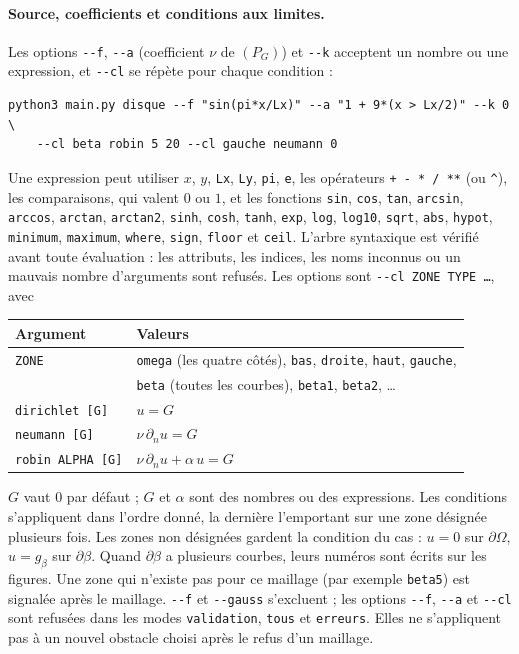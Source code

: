\documentclass[11pt,a4paper]{article}
\begin{document}
\paragraph{Source, coefficients et conditions aux limites.} Les options
\texttt{-{}-f}, \texttt{-{}-a} (coefficient $\nu$ de $(P_G)$) et \texttt{-{}-k}
acceptent un nombre ou une expression, et \texttt{-{}-cl} se répète pour chaque
condition :
\begin{verbatim}
python3 main.py disque --f "sin(pi*x/Lx)" --a "1 + 9*(x > Lx/2)" --k 0 \
    --cl beta robin 5 20 --cl gauche neumann 0
\end{verbatim}
Une expression peut utiliser $x$, $y$, \texttt{Lx}, \texttt{Ly}, \texttt{pi},
\texttt{e}, les opérateurs \texttt{+ - * / **} (ou \verb|^|), les comparaisons,
qui valent $0$ ou $1$, et les fonctions \texttt{sin}, \texttt{cos},
\texttt{tan}, \texttt{arcsin}, \texttt{arccos}, \texttt{arctan},
\texttt{arctan2}, \texttt{sinh}, \texttt{cosh}, \texttt{tanh}, \texttt{exp},
\texttt{log}, \texttt{log10}, \texttt{sqrt}, \texttt{abs}, \texttt{hypot},
\texttt{minimum}, \texttt{maximum}, \texttt{where}, \texttt{sign},
\texttt{floor} et \texttt{ceil}. L'arbre syntaxique est vérifié avant toute
évaluation : les attributs, les indices, les noms inconnus ou un mauvais nombre
d'arguments sont refusés. Les options sont \texttt{-{}-cl ZONE TYPE \dots}, avec
\begin{center}
\begin{tabular}{ll}
\hline
Argument & Valeurs \\
\hline
\texttt{ZONE} & \texttt{omega} (les quatre côtés), \texttt{bas}, \texttt{droite},
                \texttt{haut}, \texttt{gauche}, \\
              & \texttt{beta} (toutes les courbes), \texttt{beta1},
                \texttt{beta2}, \dots \\
\texttt{dirichlet [G]} & $u = G$ \\
\texttt{neumann [G]}   & $\nu\, \partial_n u = G$ \\
\texttt{robin ALPHA [G]} & $\nu\, \partial_n u + \alpha\, u = G$ \\
\hline
\end{tabular}
\end{center}
$G$ vaut $0$ par défaut ; $G$ et $\alpha$ sont des nombres ou des expressions.
Les conditions s'appliquent dans l'ordre donné, la dernière l'emportant sur
une zone désignée plusieurs fois. Les zones non désignées gardent la condition
du cas : $u = 0$ sur $\partial\Omega$, $u = g_\beta$ sur $\partial\beta$. Quand
$\partial\beta$ a plusieurs courbes, leurs numéros sont écrits sur les figures.
Une zone qui n'existe pas pour ce maillage (par exemple \texttt{beta5}) est
signalée après le maillage. \texttt{-{}-f} et \texttt{-{}-gauss} s'excluent ; les
options \texttt{-{}-f}, \texttt{-{}-a} et \texttt{-{}-cl} sont refusées dans les modes
\texttt{validation}, \texttt{tous} et \texttt{erreurs}. Elles ne s'appliquent
pas à un nouvel obstacle choisi après le refus d'un maillage.
\end{document}
